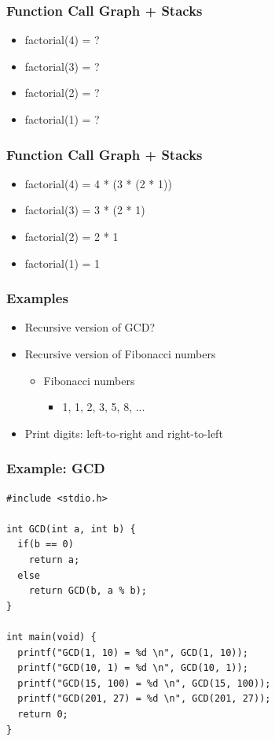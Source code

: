 \documentclass{../c-lecture}
\begin{document}
\begin{frame}
  \frametitle{Function Call Graph + Stacks}
  \begin{itemize}
    \item factorial(4) = ?
    \item factorial(3) = ?
    \item factorial(2) = ?
    \item factorial(1) = ?
  \end{itemize}
\end{frame}

\begin{frame}
  \frametitle{Function Call Graph + Stacks}
  \begin{itemize}
    \item factorial(4) = 4 * (3 * (2 * 1))
    \item factorial(3) = 3 * (2 * 1)
    \item factorial(2) = 2 * 1
    \item factorial(1) = 1
  \end{itemize}
\end{frame}

\begin{frame}
  \frametitle{Examples}
  \begin{itemize}
    \item Recursive version of GCD?
    \item Recursive version of Fibonacci numbers
    \begin{itemize}
      \item Fibonacci numbers
      \begin{itemize}
        \item 1, 1, 2, 3, 5, 8, ...
      \end{itemize}
    \end{itemize}
    \item Print digits: left-to-right and right-to-left
  \end{itemize}
\end{frame}

\begin{frame}[fragile]
  \frametitle{Example: GCD}
  \begin{verbatim}
#include <stdio.h>

int GCD(int a, int b) {
  if(b == 0)
    return a;
  else
    return GCD(b, a % b);
}

int main(void) {
  printf("GCD(1, 10) = %d \n", GCD(1, 10));
  printf("GCD(10, 1) = %d \n", GCD(10, 1));
  printf("GCD(15, 100) = %d \n", GCD(15, 100));
  printf("GCD(201, 27) = %d \n", GCD(201, 27));
  return 0;
}
  \end{verbatim}
\end{frame}
\end{document}
